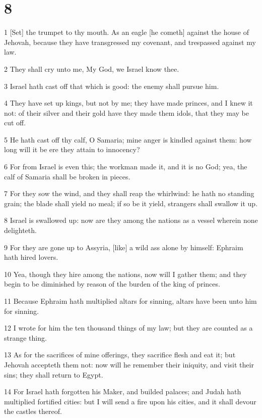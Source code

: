 \chapter{8}

\par 1 [Set] the trumpet to thy mouth. As an eagle [he cometh] against the house of Jehovah, because they have transgressed my covenant, and trespassed against my law.
\par 2 They shall cry unto me, My God, we Israel know thee.
\par 3 Israel hath cast off that which is good: the enemy shall pursue him.
\par 4 They have set up kings, but not by me; they have made princes, and I knew it not: of their silver and their gold have they made them idols, that they may be cut off.
\par 5 He hath cast off thy calf, O Samaria; mine anger is kindled against them: how long will it be ere they attain to innocency?
\par 6 For from Israel is even this; the workman made it, and it is no God; yea, the calf of Samaria shall be broken in pieces.
\par 7 For they sow the wind, and they shall reap the whirlwind: he hath no standing grain; the blade shall yield no meal; if so be it yield, strangers shall swallow it up.
\par 8 Israel is swallowed up: now are they among the nations as a vessel wherein none delighteth.
\par 9 For they are gone up to Assyria, [like] a wild ass alone by himself: Ephraim hath hired lovers.
\par 10 Yea, though they hire among the nations, now will I gather them; and they begin to be diminished by reason of the burden of the king of princes.
\par 11 Because Ephraim hath multiplied altars for sinning, altars have been unto him for sinning.
\par 12 I wrote for him the ten thousand things of my law; but they are counted as a strange thing.
\par 13 As for the sacrifices of mine offerings, they sacrifice flesh and eat it; but Jehovah accepteth them not: now will he remember their iniquity, and visit their sins; they shall return to Egypt.
\par 14 For Israel hath forgotten his Maker, and builded palaces; and Judah hath multiplied fortified cities: but I will send a fire upon his cities, and it shall devour the castles thereof.

